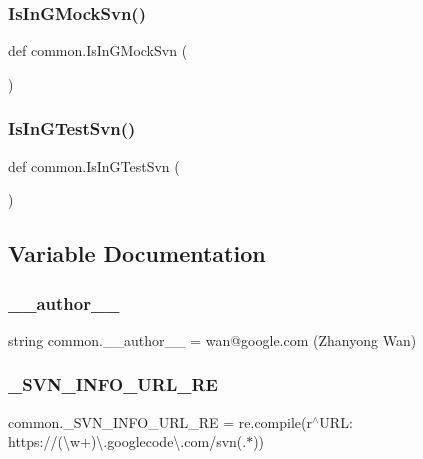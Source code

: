 \subsubsection{\texorpdfstring{IsInGMockSvn()}{IsInGMockSvn()}}
{\footnotesize\ttfamily def common.\+Is\+In\+G\+Mock\+Svn (\begin{DoxyParamCaption}{ }\end{DoxyParamCaption})}

\mbox{\label{namespacecommon_af29dcab2d7b4a9dd846446a0987ab387}} 
\subsubsection{\texorpdfstring{IsInGTestSvn()}{IsInGTestSvn()}}
{\footnotesize\ttfamily def common.\+Is\+In\+G\+Test\+Svn (\begin{DoxyParamCaption}{ }\end{DoxyParamCaption})}



\subsection{Variable Documentation}
\mbox{\label{namespacecommon_ac0f2c8f2583f0817f09a3e0c6022d707}} 
\subsubsection{\texorpdfstring{\_\_author\_\_}{\_\_author\_\_}}
{\footnotesize\ttfamily string common.\+\_\+\+\_\+author\+\_\+\+\_\+ = \textquotesingle{}wan@google.\+com (Zhanyong Wan)\textquotesingle{}\hspace{0.3cm}{\ttfamily [private]}}

\mbox{\label{namespacecommon_a8441f667816bce34e6100f88a9ea7dfa}} 
\subsubsection{\texorpdfstring{\_SVN\_INFO\_URL\_RE}{\_SVN\_INFO\_URL\_RE}}
{\footnotesize\ttfamily common.\+\_\+\+S\+V\+N\+\_\+\+I\+N\+F\+O\+\_\+\+U\+R\+L\+\_\+\+RE = re.\+compile(r\textquotesingle{}$^\wedge$U\+R\+L\+: https\+://(\textbackslash{}w+)\textbackslash{}.googlecode\textbackslash{}.\+com/svn(.$\ast$)\textquotesingle{})\hspace{0.3cm}{\ttfamily [private]}}

